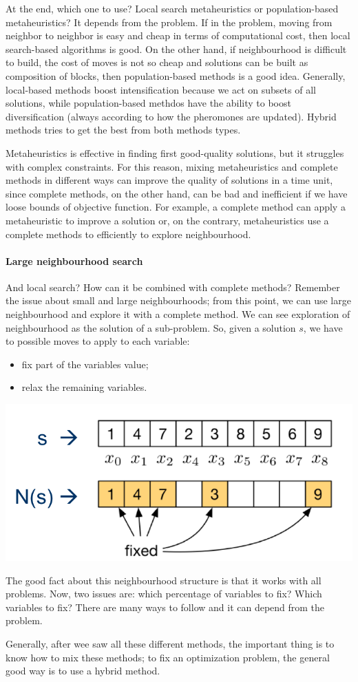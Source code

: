 \documentclass[10pt,a4paper]{article}
\begin{document}
At the end, which one to use? Local search metaheuristics or population-based
metaheuristics? It depends from the problem. If in the problem, moving from
neighbor to neighbor is easy and cheap in terms of computational cost, then
local search-based algorithms is good. On the other hand, if neighbourhood is
difficult to build, the cost of moves is not so cheap and solutions can be built
as composition of blocks, then population-based methods is a good idea.
Generally, local-based methods boost intensification because we act on subsets
of all solutions, while population-based methdos have the ability to boost
diversification (always according to how the pheromones are updated). Hybrid
methods tries to get the best from both methods types.

Metaheuristics is effective in finding first good-quality solutions, but it
struggles with complex constraints. For this reason, mixing metaheuristics and
complete methods in different ways can improve the quality of solutions in a
time unit, since complete methods, on the other hand, can be bad and inefficient
if we have loose bounds of objective function. For example, a complete method
can apply a metaheuristic to improve a solution or, on the contrary,
metaheuristics use a complete methods to efficiently to explore neighbourhood.

\paragraph{Large neighbourhood search}
And local search? How can it be combined with complete methods? Remember the
issue about small and large neighbourhoods; from this point, we can use large
neighbourhood and explore it with a complete method. We can see exploration of
neighbourhood as the solution of a sub-problem. So, given a solution $s$, we
have to possible moves to apply to each variable:
\begin{itemize}
    \item fix part of the variables value;
    \item relax the remaining variables.
\end{itemize}
\includegraphics[scale=0.25]{fix_relax.png}

The good fact about this neighbourhood structure is that it works with all
problems. Now, two issues are: which percentage of variables to fix? Which
variables to fix? There are many ways to follow and it can depend from the
problem.

Generally, after wee saw all these different methods, the important thing is to
know how to mix these methods; to fix an optimization problem, the general good
way is to use a hybrid method.
\end{document}
